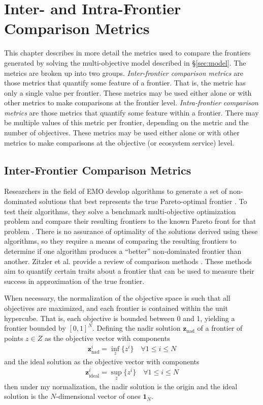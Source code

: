  
\chapter{Inter- and Intra-Frontier Comparison Metrics}
\label{chap:appCComparisonMetrics}
This chapter describes in more detail the metrics used to compare the frontiers generated by solving the multi-objective model described in \S \ref{sec:model}. The metrics are broken up into two groups. \textit{Inter-frontier comparison metrics} are those metrics that quantify some feature of a frontier. That is, the metric has only a single value per frontier. These metrics may be used either alone or with other metrics to make comparisons at the frontier level. \textit{Intra-frontier comparison metrics} are those metrics that quantify some feature within a frontier. There may be multiple values of this metric per frontier, depending on the metric and the number of objectives. These metrics may be used either alone or with other metrics to make comparisons at the objective (or ecosystem service) level.

\section{Inter-Frontier Comparison Metrics}
\label{sec:emoMetrics}
Researchers in the field of EMO develop algorithms to generate a set of non-dominated solutions that best represents the true Pareto-optimal frontier \cite{deb2001multi}. To test their algorithms, they solve a benchmark multi-objective optimization problem and compare their resulting frontiers to the known Pareto front for that problem \cite{knowles2002metrics}. There is no assurance of optimality of the solutions derived using these algorithms, so they require a means of comparing the resulting frontiers to determine if one algorithm produces a ``better'' non-dominated frontier than another. Zitzler et al. provide a review of comparison methods \cite{zitzler2003performance}. These methods aim to quantify certain traits about a frontier that can be used to measure their success in approximation of the true frontier.

When necessary, the normalization of the objective space is such that all objectives are maximized, and each frontier is contained within the unit hypercube. That is, each objective is bounded between 0 and 1, yielding a frontier bounded by $[0,1]^N$. Defining the nadir solution $\mathbf{z}_{\text{nad}}$ of a frontier of points $z \in Z$ as the objective vector with components
\begin{align}
\mathbf{z}_{\text{nad}}^i = \inf_{z} \{ z^i \} \quad \forall 1 \le i \le N
\end{align}
and the ideal solution as the objective vector with components
\begin{align}
\mathbf{z}_{\text{ideal}}^i = \sup_{z} \{ z^i \} \quad \forall 1 \le i \le N
\end{align}
then under my normalization, the nadir solution is the origin and the ideal solution is the $N$-dimensional vector of ones $\mathbf{1}_N$.

